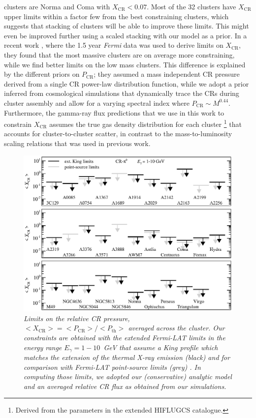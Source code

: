 \documentclass[10pt,aps,pra,reprint,amsmath,amsfonts,amssymb,showpacs,nofootinbib,floatfix]{revtex4-1}
\newcommand{\Fermi}{{\em Fermi}\xspace}
\newcommand{\rmn}{\mathrm}
\newcommand{\CR}{\rmn{CR}}
\begin{document}
{clusters are Norma and Coma with $X_\CR < 0.07$. Most of the 32
clusters have $X_\CR$ upper limits within a factor few from the best
constraining clusters, which suggests that stacking of clusters will
be able to improve these limits. This might even be improved further
using a scaled stacking with our model as a prior. In a recent work
\cite{2010ApJ...717L..71A}, where the 1.5 year \Fermi data was used to
derive limits on $X_\CR$, they found that the most massive clusters
are on average more constraining, while we find better limits on the
low mass clusters. This difference is explained by the different
priors on $P_\CR$; they assumed a mass independent CR pressure derived
from a single CR power-law distribution function, while we adopt a
prior inferred from cosmological simulations that dynamically trace the
CRs during cluster assembly and allow for a varying spectral index
where $P_\CR\sim M^{0.44}$. Furthermore, the gamma-ray flux
predictions that we use in this work to constrain $X_\CR$ assumes the
true gas density distribution for each cluster \footnote{Derived from
  the parameters in the extended HIFLUGCS catalogue.} that accounts
for cluster-to-cluster scatter, in contrast to the mass-to-luminosity
scaling relations that was used in previous work.}

\begin{figure}
\begin{minipage}{2.0\columnwidth}
  \includegraphics[width=0.99\columnwidth]{figures/XCR.Fermi.eps}
  \caption{\it Limits on the relative CR pressure, $< X_\rmn{CR}> = <
    P_\rmn{CR} > / < P_\rmn{th}>$ averaged across the cluster. Our
    constraints are obtained with the extended \Fermi-LAT limits in the energy
    range $E_\gamma=1-10$~GeV that assume a King profile which matches the
    extension of the thermal X-ray emission (black) and for comparison with
    \Fermi-LAT point-source limits (grey) \cite{2010ApJ...717L..71A}. In
    computing those limits, we adopted our (conservative) analytic model
    \cite{2010MNRAS.409..449P} and an averaged relative CR flux as obtained from
    our simulations.}
 \label{fig:XCR}
\end{minipage}
\end{figure}
\end{document}
